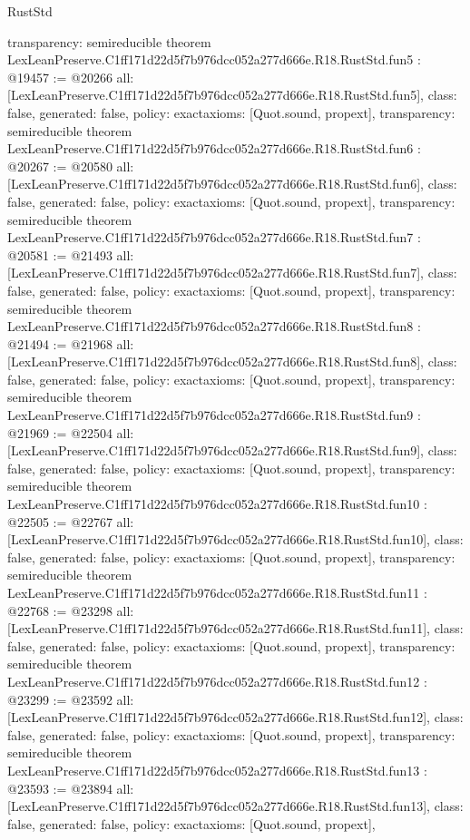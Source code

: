 \begin{lexlean}{RustStd}
\begin{coremodule}
{  transparency: semireducible
}
theorem LexLeanPreserve.C1ff171d22d5f7b976dcc052a277d666e.R18.RustStd.fun5 : @19457 := @20266 {
  all: [LexLeanPreserve.C1ff171d22d5f7b976dcc052a277d666e.R18.RustStd.fun5],
  class: false,
  generated: false,
  policy: exact{axioms: [Quot.sound, propext]},
  transparency: semireducible
}
theorem LexLeanPreserve.C1ff171d22d5f7b976dcc052a277d666e.R18.RustStd.fun6 : @20267 := @20580 {
  all: [LexLeanPreserve.C1ff171d22d5f7b976dcc052a277d666e.R18.RustStd.fun6],
  class: false,
  generated: false,
  policy: exact{axioms: [Quot.sound, propext]},
  transparency: semireducible
}
theorem LexLeanPreserve.C1ff171d22d5f7b976dcc052a277d666e.R18.RustStd.fun7 : @20581 := @21493 {
  all: [LexLeanPreserve.C1ff171d22d5f7b976dcc052a277d666e.R18.RustStd.fun7],
  class: false,
  generated: false,
  policy: exact{axioms: [Quot.sound, propext]},
  transparency: semireducible
}
theorem LexLeanPreserve.C1ff171d22d5f7b976dcc052a277d666e.R18.RustStd.fun8 : @21494 := @21968 {
  all: [LexLeanPreserve.C1ff171d22d5f7b976dcc052a277d666e.R18.RustStd.fun8],
  class: false,
  generated: false,
  policy: exact{axioms: [Quot.sound, propext]},
  transparency: semireducible
}
theorem LexLeanPreserve.C1ff171d22d5f7b976dcc052a277d666e.R18.RustStd.fun9 : @21969 := @22504 {
  all: [LexLeanPreserve.C1ff171d22d5f7b976dcc052a277d666e.R18.RustStd.fun9],
  class: false,
  generated: false,
  policy: exact{axioms: [Quot.sound, propext]},
  transparency: semireducible
}
theorem LexLeanPreserve.C1ff171d22d5f7b976dcc052a277d666e.R18.RustStd.fun10 : @22505 := @22767 {
  all: [LexLeanPreserve.C1ff171d22d5f7b976dcc052a277d666e.R18.RustStd.fun10],
  class: false,
  generated: false,
  policy: exact{axioms: [Quot.sound, propext]},
  transparency: semireducible
}
theorem LexLeanPreserve.C1ff171d22d5f7b976dcc052a277d666e.R18.RustStd.fun11 : @22768 := @23298 {
  all: [LexLeanPreserve.C1ff171d22d5f7b976dcc052a277d666e.R18.RustStd.fun11],
  class: false,
  generated: false,
  policy: exact{axioms: [Quot.sound, propext]},
  transparency: semireducible
}
theorem LexLeanPreserve.C1ff171d22d5f7b976dcc052a277d666e.R18.RustStd.fun12 : @23299 := @23592 {
  all: [LexLeanPreserve.C1ff171d22d5f7b976dcc052a277d666e.R18.RustStd.fun12],
  class: false,
  generated: false,
  policy: exact{axioms: [Quot.sound, propext]},
  transparency: semireducible
}
theorem LexLeanPreserve.C1ff171d22d5f7b976dcc052a277d666e.R18.RustStd.fun13 : @23593 := @23894 {
  all: [LexLeanPreserve.C1ff171d22d5f7b976dcc052a277d666e.R18.RustStd.fun13],
  class: false,
  generated: false,
  policy: exact{axioms: [Quot.sound, propext]},
}
\end{coremodule}
\end{lexlean}
